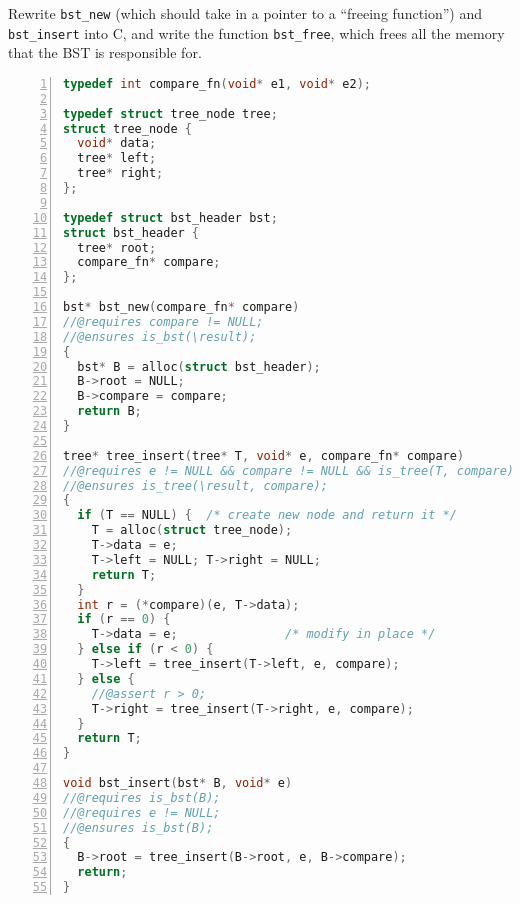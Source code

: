 
Rewrite \lstinline[language=C]'bst_new' (which should take in a
pointer to a ``freeing function'') and
\lstinline[language=C]'bst_insert' into C, and write the function
\lstinline[language=C]'bst_free', which frees all the memory that the
BST is responsible for.

\bgroup
\smalllistings
\begin{lstlisting}[numbers=left, language=C]
typedef int compare_fn(void* e1, void* e2);

typedef struct tree_node tree;
struct tree_node {
  void* data;
  tree* left;
  tree* right;
};

typedef struct bst_header bst;
struct bst_header {
  tree* root;
  compare_fn* compare;
};

bst* bst_new(compare_fn* compare)
//@requires compare != NULL;
//@ensures is_bst(\result);
{
  bst* B = alloc(struct bst_header);
  B->root = NULL;
  B->compare = compare;
  return B;
}

tree* tree_insert(tree* T, void* e, compare_fn* compare)
//@requires e != NULL && compare != NULL && is_tree(T, compare);
//@ensures is_tree(\result, compare);
{
  if (T == NULL) {  /* create new node and return it */
    T = alloc(struct tree_node);
    T->data = e;
    T->left = NULL; T->right = NULL;
    return T;
  }
  int r = (*compare)(e, T->data);
  if (r == 0) {
    T->data = e;               /* modify in place */
  } else if (r < 0) {
    T->left = tree_insert(T->left, e, compare);
  } else {
    //@assert r > 0;
    T->right = tree_insert(T->right, e, compare);
  }
  return T;
}

void bst_insert(bst* B, void* e)
//@requires is_bst(B);
//@requires e != NULL;
//@ensures is_bst(B);
{
  B->root = tree_insert(B->root, e, B->compare);
  return;
}
\end{lstlisting}

